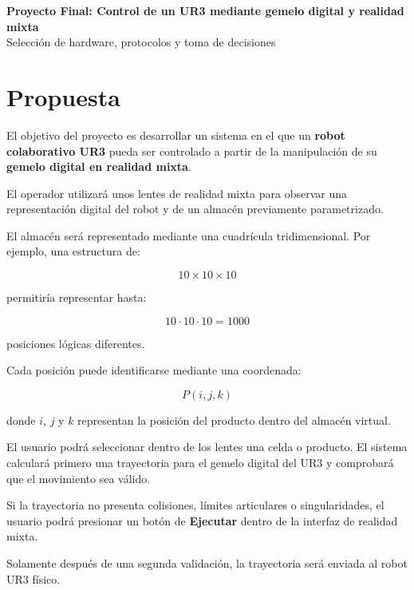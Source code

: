 \documentclass[12pt,letterpaper]{article}
\begin{document}

\begin{center}
    {\LARGE \textbf{Proyecto Final: Control de un UR3 mediante gemelo digital y realidad mixta}}\\[0.3cm]
    {\large Selección de hardware, protocolos y toma de decisiones}
\end{center}

\section{Propuesta}

El objetivo del proyecto es desarrollar un sistema en el que un 
\textbf{robot colaborativo UR3} pueda ser controlado a partir de la 
manipulación de su \textbf{gemelo digital en realidad mixta}.

El operador utilizará unos lentes de realidad mixta para observar una
representación digital del robot y de un almacén previamente parametrizado.

El almacén será representado mediante una cuadrícula tridimensional. 
Por ejemplo, una estructura de:

\[
10 \times 10 \times 10
\]

permitiría representar hasta:

\[
10 \cdot 10 \cdot 10 = 1000
\]

posiciones lógicas diferentes.

Cada posición puede identificarse mediante una coordenada:

\[
P(i,j,k)
\]

donde $i$, $j$ y $k$ representan la posición del producto dentro del
almacén virtual.

El usuario podrá seleccionar dentro de los lentes una celda o producto.
El sistema calculará primero una trayectoria para el gemelo digital del
UR3 y comprobará que el movimiento sea válido.

Si la trayectoria no presenta colisiones, límites articulares o
singularidades, el usuario podrá presionar un botón de
\textbf{Ejecutar} dentro de la interfaz de realidad mixta.

Solamente después de una segunda validación, la trayectoria será enviada
al robot UR3 físico.

\end{document}
